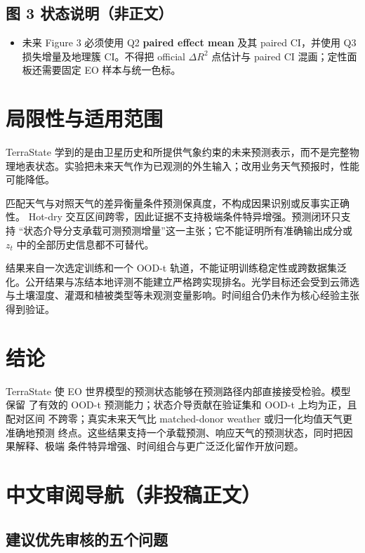 \documentclass[11pt,a4paper,fontset=fandol]{ctexart}
\begin{document}
\subsection*{图 3 状态说明（非正文）}

\begin{itemize}
\item 未来 Figure 3 必须使用 Q2 \textbf{paired effect mean} 及其 paired CI，并使用 Q3 损失增量及地理簇 CI。不得把 official $\Delta R^2$ 点估计与 paired CI 混画；定性面板还需要固定 EO 样本与统一色标。
\end{itemize}

\section{局限性与适用范围}

TerraState 学到的是由卫星历史和所提供气象约束的未来预测表示，而不是完整物理地表状态。实验把未来天气作为已观测的外生输入；改用业务天气预报时，性能可能降低。

匹配天气与对照天气的差异衡量条件预测保真度，不构成因果识别或反事实正确性。 Hot-dry 交互区间跨零，因此证据不支持极端条件特异增强。预测闭环只支持 “状态介导分支承载可测预测增量”这一主张；它不能证明所有准确输出成分或 $z_t$ 中的全部历史信息都不可替代。

结果来自一次选定训练和一个 OOD-t 轨道，不能证明训练稳定性或跨数据集泛化。公开结果与冻结本地评测不能建立严格跨实现排名。光学目标还会受到云筛选与土壤湿度、灌溉和植被类型等未观测变量影响。时间组合仍未作为核心经验主张得到验证。

\section{结论}

TerraState 使 EO 世界模型的预测状态能够在预测路径内部直接接受检验。模型保留 了有效的 OOD-t 预测能力；状态介导贡献在验证集和 OOD-t 上均为正，且配对区间 不跨零；真实未来天气比 matched-donor weather 或归一化均值天气更准确地预测 终点。这些结果支持一个承载预测、响应天气的预测状态，同时把因果解释、极端 条件特异增强、时间组合与更广泛泛化留作开放问题。


\clearpage
\appendix
\section{中文审阅导航（非投稿正文）}

\subsection{建议优先审核的五个问题}
\end{document}

